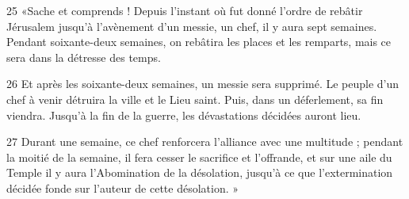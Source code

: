 
25 «Sache et comprends ! Depuis l’instant où fut donné l’ordre de rebâtir Jérusalem jusqu’à l’avènement d’un messie, un chef, il y aura sept semaines. Pendant soixante-deux semaines, on rebâtira les places et les remparts, mais ce sera dans la détresse des temps.

26 Et après les soixante-deux semaines, un messie sera supprimé. Le peuple d’un chef à venir détruira la ville et le Lieu saint. Puis, dans un déferlement, sa fin viendra. Jusqu’à la fin de la guerre, les dévastations décidées auront lieu.

27 Durant une semaine, ce chef renforcera l’alliance avec une multitude ; pendant la moitié de la semaine, il fera cesser le sacrifice et l’offrande, et sur une aile du Temple il y aura l’Abomination de la désolation, jusqu’à ce que l’extermination décidée fonde sur l’auteur de cette désolation. »